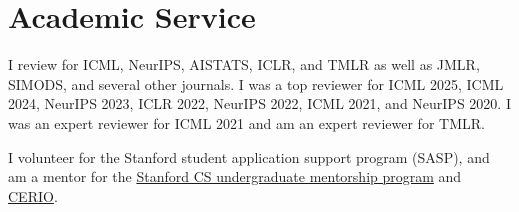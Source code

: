 \documentclass[10pt]{article}
\begin{document}
\section{Academic Service}

I review for ICML, NeurIPS, AISTATS, ICLR, and TMLR as well as
JMLR, SIMODS, and several other journals.
I was a top reviewer for ICML 2025, ICML 2024, NeurIPS 2023, ICLR 2022, NeurIPS
2022, ICML 2021, and NeurIPS 2020.
I was an expert reviewer for ICML 2021 and am an expert reviewer for TMLR.

I volunteer for the Stanford student application support program (SASP), and
am a mentor for the \href{https://stanfordcsmentoring.com}{Stanford CS
    undergraduate mentorship program} and
\href{https://serio.stanford.edu}{CERIO}.


\end{document}
